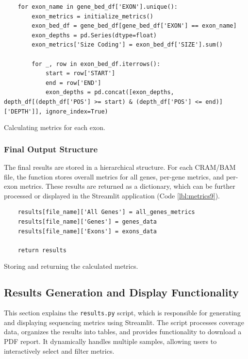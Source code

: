 \begin{longlisting}
\begin{verbatim}
    for exon_name in gene_bed_df['EXON'].unique():
        exon_metrics = initialize_metrics()
        exon_bed_df = gene_bed_df[gene_bed_df['EXON'] == exon_name]
        exon_depths = pd.Series(dtype=float)
        exon_metrics['Size Coding'] = exon_bed_df['SIZE'].sum()

        for _, row in exon_bed_df.iterrows():
            start = row['START']
            end = row['END']
            exon_depths = pd.concat([exon_depths, depth_df[(depth_df['POS'] >= start) & (depth_df['POS'] <= end)]['DEPTH']], ignore_index=True)
\end{verbatim}
\caption{Calculating metrics for each exon.}
\label{lbl:metrics8}
\end{longlisting}

\subsubsection{\textbf{Final Output Structure}}

The final results are stored in a hierarchical structure. For each CRAM/BAM file, the function stores overall metrics for all genes, per-gene metrics, and per-exon metrics. These results are returned as a dictionary, which can be further processed or displayed in the Streamlit application (Code \ref{lbl:metrics9}).

\begin{longlisting}
\begin{verbatim}
    results[file_name]['All Genes'] = all_genes_metrics
    results[file_name]['Genes'] = genes_data
    results[file_name]['Exons'] = exons_data

    return results
\end{verbatim}
\caption{Storing and returning the calculated metrics.}
\label{lbl:metrics9}
\end{longlisting}

\subsection{Results Generation and Display Functionality}

This section explains the \texttt{results.py} script, which is responsible for generating and displaying sequencing metrics using Streamlit. The script processes coverage data, organizes the results into tables, and provides functionality to download a PDF report. It dynamically handles multiple samples, allowing users to interactively select and filter metrics.

